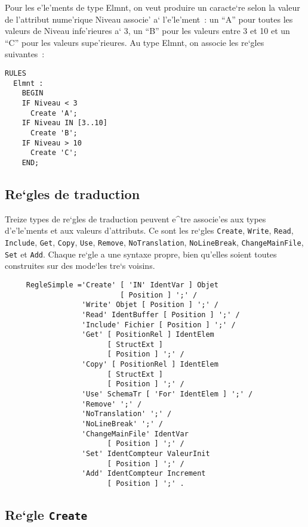 {\begin{example}
Pour les e'le'ments de type Elmnt, on veut produire un caracte`re selon
la valeur de l'attribut nume'rique Niveau associe' a` l'e'le'ment~: un ``A''
pour toutes les valeurs de Niveau infe'rieures a` 3, un ``B'' pour les valeurs
entre 3 et 10 et un ``C'' pour les valeurs supe'rieures. Au type Elmnt, on
associe les re`gles suivantes~:
\begin{verbatim}
RULES
  Elmnt :
    BEGIN
    IF Niveau < 3
      Create 'A';
    IF Niveau IN [3..10]
      Create 'B';
    IF Niveau > 10
      Create 'C';
    END;
\end{verbatim}
\end{example}

\subsection{Re`gles de traduction}

Treize types de re`gles de traduction peuvent e^tre associe'es aux types
d'e'le'ments et aux valeurs d'attributs. Ce sont les re`gles {\tt Create},
{\tt Write}, {\tt Read}, {\tt Include}, {\tt Get}, {\tt Copy}, {\tt Use},
{\tt Remove}, {\tt NoTranslation}, {\tt NoLineBreak}, {\tt ChangeMainFile},
{\tt Set} et {\tt Add}.
Chaque re`gle a une syntaxe propre, bien qu'elles soient
toutes construites sur des mode`les tre`s voisins.

\begin{verbatim}
     RegleSimple ='Create' [ 'IN' IdentVar ] Objet
                           [ Position ] ';' /
                  'Write' Objet [ Position ] ';' /
                  'Read' IdentBuffer [ Position ] ';' /
                  'Include' Fichier [ Position ] ';' /
                  'Get' [ PositionRel ] IdentElem 
                        [ StructExt ] 
                        [ Position ] ';' /
                  'Copy' [ PositionRel ] IdentElem 
                        [ StructExt ] 
                        [ Position ] ';' /
                  'Use' SchemaTr [ 'For' IdentElem ] ';' /
                  'Remove' ';' /
                  'NoTranslation' ';' /
                  'NoLineBreak' ';' /
                  'ChangeMainFile' IdentVar
                        [ Position ] ';' /
                  'Set' IdentCompteur ValeurInit
                        [ Position ] ';' /
                  'Add' IdentCompteur Increment
                        [ Position ] ';' .
\end{verbatim}

\subsection{Re`gle {\tt Create}}
\label{create}

}
